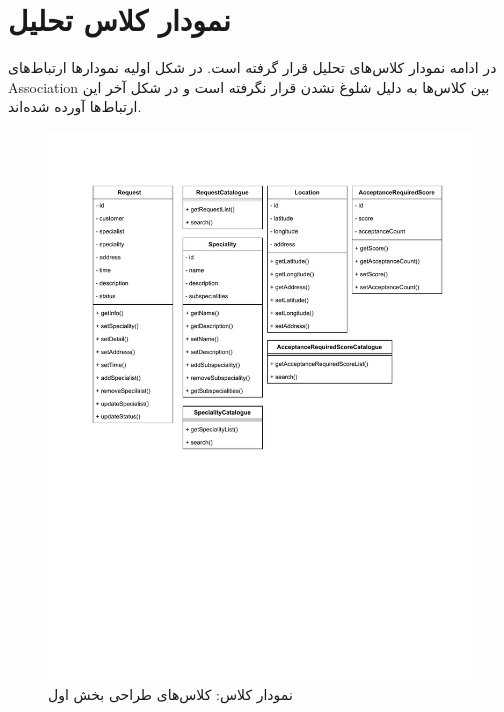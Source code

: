 

\chapter{نمودار کلاس تحلیل}
\label{chapter:classAnalysis}

در ادامه نمودار کلاس‌های تحلیل قرار گرفته است. در شکل اولیه نمودار‌ها ارتباط‌های Association بین کلاس‌ها به دلیل شلوغ نشدن قرار نگرفته است و در شکل آخر این ارتباط‌ها آورده شده‌اند.


\begin{figure}[ht!]
	\centering
	\includegraphics[scale=0.8]{figs/OOD-class-page-1.pdf}
	\caption{نمودار کلاس: کلاس‌های طراحی بخش اول}
\end{figure}
\FloatBarrier
\newpage


